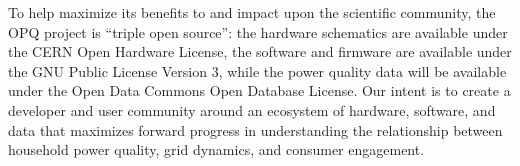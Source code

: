 \documentclass[11pt]{article}
\begin{document}
To help maximize its benefits to and impact upon the scientific community, the OPQ project is ``triple open source'': the hardware schematics are available under the CERN Open Hardware License, the software and firmware are available under the GNU Public License Version 3, while the power quality data will be available under the Open Data Commons Open Database License.  Our intent is to create a developer and user community around an ecosystem of hardware, software, and data that maximizes forward progress in understanding the relationship between household power quality, grid dynamics, and consumer engagement.





 
\end{document}
